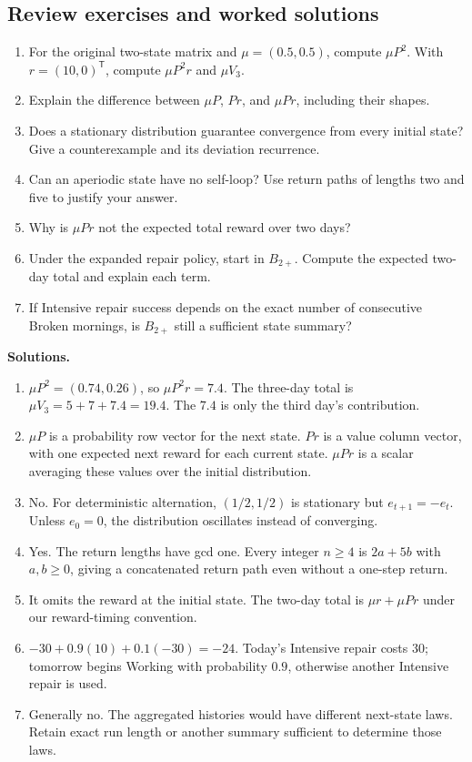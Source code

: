 \documentclass[11pt]{article}
\theoremstyle{remark}\newtheorem{remark}[definition]{Remark}
\begin{document}
\subsection{Review exercises and worked solutions}
\begin{enumerate}
\item For the original two-state matrix and $\mu=(0.5,0.5)$, compute $\mu P^2$. With $r=(10,0)^{\mathsf T}$, compute $\mu P^2r$ and $\mu V_3$.
\item Explain the difference between $\mu P$, $Pr$, and $\mu Pr$, including their shapes.
\item Does a stationary distribution guarantee convergence from every initial state? Give a counterexample and its deviation recurrence.
\item Can an aperiodic state have no self-loop? Use return paths of lengths two and five to justify your answer.
\item Why is $\mu Pr$ not the expected total reward over two days?
\item Under the expanded repair policy, start in $B_{2+}$. Compute the expected two-day total and explain each term.
\item If Intensive repair success depends on the exact number of consecutive Broken mornings, is $B_{2+}$ still a sufficient state summary?
\end{enumerate}
\textbf{Solutions.}
\begin{enumerate}
\item $\mu P^2=(0.74,0.26)$, so $\mu P^2r=7.4$. The three-day total is $\mu V_3=5+7+7.4=19.4$. The $7.4$ is only the third day's contribution.
\item $\mu P$ is a probability row vector for the next state. $Pr$ is a value column vector, with one expected next reward for each current state. $\mu Pr$ is a scalar averaging these values over the initial distribution.
\item No. For deterministic alternation, $(1/2,1/2)$ is stationary but $e_{t+1}=-e_t$. Unless $e_0=0$, the distribution oscillates instead of converging.
\item Yes. The return lengths have gcd one. Every integer $n\geq4$ is $2a+5b$ with $a,b\geq0$, giving a concatenated return path even without a one-step return.
\item It omits the reward at the initial state. The two-day total is $\mu r+\mu Pr$ under our reward-timing convention.
\item $-30+0.9(10)+0.1(-30)=-24$. Today's Intensive repair costs $30$; tomorrow begins Working with probability $0.9$, otherwise another Intensive repair is used.
\item Generally no. The aggregated histories would have different next-state laws. Retain exact run length or another summary sufficient to determine those laws.
\end{enumerate}
\end{document}
